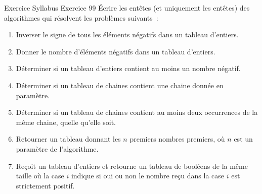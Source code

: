 \begin{frame}[shrink]{Exercice \theexercice}{Syllabus Exercice 99}
    Écrire les entêtes (et uniquement les entêtes)
    des algorithmes qui résolvent les problèmes suivants~:
    \begin{enumerate}
        \item
        Inverser le signe de tous les éléments négatifs dans un tableau d’entiers.
        \item
        Donner le nombre d’éléments négatifs dans un tableau d’entiers.
        \item
        Déterminer si un tableau d’entiers contient au moins un nombre négatif.
        \item
        Déterminer si un tableau de chaines contient
        une chaine donnée en paramètre.
        \item
        Déterminer si un tableau de chaines contient
        au moins deux occurrences de la même chaine,
        quelle qu’elle soit.
        \item
        Retourner un tableau donnant les $n$ premiers nombres premiers,
        où $n$ est un paramètre de l’algorithme.
        \item
        Reçoit un tableau d’entiers
        et retourne un tableau de booléens de la même taille
        où la case $i$ indique si oui ou non
        le nombre reçu dans la case $i$ est strictement positif.
    \end{enumerate}
\end{frame}

